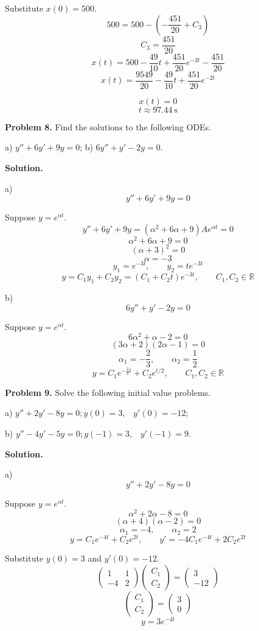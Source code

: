 \documentclass[11pt,a4paper]{article}
\begin{document}
Substitute \(x(0)=500\).
\[
500=500-\left(-\frac{451}{20}+C_3\right)
\]
\[
C_3=\frac{451}{20}
\]
\[
x(t)=500-\frac{49}{10}t
+\frac{451}{20}e^{-2t}-\frac{451}{20}
\]
\[
x(t)=\frac{9549}{20}-\frac{49}{10}t
+\frac{451}{20}e^{-2t}
\]

\[
x(t)=0
\]
\[
t\approx97.44\ \mathrm s
\]

\bigskip
\bigskip
\noindent
{\bf Problem 8.}
Find the solutions to the following ODEs.

a) $y''+6y'+9y = 0$; \;\;\;\;\; b) $6y''+y'-2y = 0$.
\par\medskip
\noindent\textbf{Solution.}\par
\medskip

\medskip
\noindent a)
\[
y''+6y'+9y=0
\]

Suppose \(y=e^{\alpha t}\).
\[
y''+6y'+9y=(\alpha^2+6\alpha+9)Ae^{\alpha t}=0
\]
\[
\alpha^2+6\alpha+9=0
\]
\[
(\alpha+3)^2=0
\]
\[
\alpha=-3
\]
\[
y_1=e^{-3t},\qquad y_2=te^{-3t}
\]
\[
y=C_1y_1+C_2y_2=(C_1+C_2t)e^{-3t},
\qquad C_1,C_2\in\mathbb R
\]

\medskip
\noindent b)
\[
6y''+y'-2y=0
\]

Suppose \(y=e^{\alpha t}\).
\[
6\alpha^2+\alpha-2=0
\]
\[
(3\alpha+2)(2\alpha-1)=0
\]
\[
\alpha_1=-\frac23,\qquad \alpha_2=\frac12
\]
\[
y=C_1e^{-\frac23t}+C_2e^{t/2},
\qquad C_1,C_2\in\mathbb R
\]

\bigskip
\noindent
{\bf Problem 9.}
Solve the following initial value problems.

a) $y''+2y'-8y = 0 ; y(0)=3, \;\;\;y'(0)= -12$;

b) $y''-4y'-5y = 0 ; y(-1)= 3,\;\;\; y'(-1) = 9$.

\par\medskip
\noindent\textbf{Solution.}\par
\medskip

\medskip
\noindent a)
\[
y''+2y'-8y=0
\]

Suppose \(y=e^{\alpha t}\).
\[
\alpha^2+2\alpha-8=0
\]
\[
(\alpha+4)(\alpha-2)=0
\]
\[
\alpha_1=-4,\qquad \alpha_2=2
\]
\[
y=C_1e^{-4t}+C_2e^{2t},
\qquad
y'=-4C_1e^{-4t}+2C_2e^{2t}
\]

Substitute \(y(0)=3\) and \(y'(0)=-12\).
\[
\begin{pmatrix}
1 & 1\\
-4 & 2
\end{pmatrix}
\begin{pmatrix}
C_1\\
C_2
\end{pmatrix}
=
\begin{pmatrix}
3\\
-12
\end{pmatrix}
\]
\[
\begin{pmatrix}
C_1\\
C_2
\end{pmatrix}
=
\begin{pmatrix}
3\\
0
\end{pmatrix}
\]
\[
y=3e^{-4t}
\]
\end{document}
